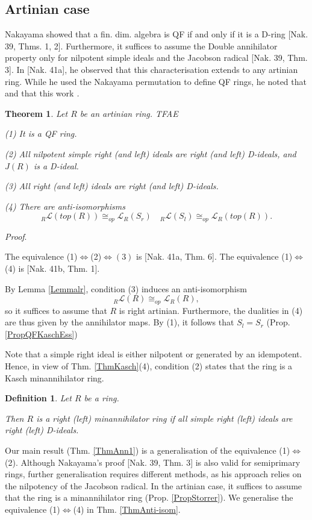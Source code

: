 \documentclass[11pt]{article}
\theoremstyle{plain}
\newtheorem{Thm}[veta]{Theorem}
\newtheorem{Def}[veta]{Definition}
\theoremstyle{remark}
\theoremstyle{plain}
\newenvironment{Proof}{
  \par\medskip\noindent
  \textit{Proof}.
}{
\newline
\rightline{$\qedsymbol$}
}
\begin{document}
\subsection{Artinian case}\label{SecDart}



Nakayama showed that a fin. dim. algebra is  QF if and only if it is a D-ring [Nak. 39, Thms. 1, 2]. Furthermore, it suffices to assume the Double annihilator property only for nilpotent simple ideals and the Jacobson radical [Nak. 39, Thm. 3]. In [Nak. 41a], he observed that this characterisation extends to any artinian ring. While he used the Nakayama permutation to define QF rings, he noted that \textit{} and that this work \textit{.}

 \begin{Thm}\label{ThmDArtin}
Let $R$ be an artinian ring. TFAE

(1) It is a QF ring.

(2) All nilpotent simple right (and left) ideals are right (and left) D-ideals, and $J(R)$ is a D-ideal.

(3) All right (and left) ideals are right (and left) D-ideals.

(4) There are anti-isomorphisms \[ {}_R\mathcal{L}(top(R)) \cong_{op} \mathcal{L}_R(S_r)\quad  {}_R\mathcal{L}(S_l) \cong_{op} \mathcal{L}_R(top(R)).\]
\end{Thm}
\begin{Proof}
    The equivalence (1)$\Leftrightarrow$(2)$\Leftrightarrow(3)$ is [Nak. 41a, Thm. 6]. The equivalence (1)$\Leftrightarrow$(4) is [Nak. 41b, Thm. 1].
\end{Proof}

By Lemma \ref{Lemmalr}, condition (3) induces an anti-isomorphism \[_R\mathcal{L}(R) \cong_{op} \mathcal{L}_R(R),\]  so it suffices to assume that $R$ is right artinian. Furthermore, the dualities in (4) are thus given by the annihilator maps. By (1), it follows that $S_l=S_r$ (Prop. \ref{PropQFKaschEss})


Note that a simple right ideal is either nilpotent or generated by an idempotent. Hence, in view of Thm. \ref{ThmKasch}(4),  condition (2) states that the ring is a Kasch minannihilator ring.
\begin{Def} Let $R$ be a ring.

Then $R$ is a \emph{right (left) minannihilator ring} if all simple right (left) ideals are right (left) D-ideals. 
\end{Def}
Our main result (Thm. \ref{ThmAnn1}) is a generalisation of the equivalence  (1)$\Leftrightarrow$(2). Although Nakayama's proof [Nak. 39, Thm. 3] is also valid for semiprimary rings, further generalisation requires different methods, as his approach relies on the nilpotency of the Jacobson radical. In the artinian case, it suffices to assume that the ring is a minannihilator ring (Prop. \ref{PropStorrer}). We generalise the equivalence (1)$\Leftrightarrow$(4) in Thm. \ref{ThmAnti-isom}.
\end{document}
